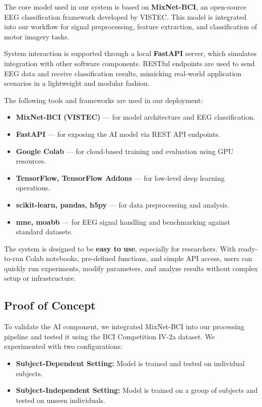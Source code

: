 The core model used in our system is based on \textbf{MixNet-BCI}, an open-source EEG classification framework developed by VISTEC. This model is integrated into our workflow for signal preprocessing, feature extraction, and classification of motor imagery tasks.

System interaction is supported through a local \textbf{FastAPI} server, which simulates integration with other software components.
RESTful endpoints are used to send EEG data and receive classification results, mimicking real-world application scenarios in a lightweight and modular fashion.

The following tools and frameworks are used in our deployment:
\begin{itemize}
    \item \textbf{MixNet-BCI (VISTEC)} — for model architecture and EEG classification.
    \item \textbf{FastAPI} — for exposing the AI model via REST API endpoints.
    \item \textbf{Google Colab} — for cloud-based training and evaluation using GPU resources.
    \item \textbf{TensorFlow, TensorFlow Addons} — for low-level deep learning operations.
    \item \textbf{scikit-learn, pandas, h5py} — for data preprocessing and analysis.
    \item \textbf{mne, moabb} — for EEG signal handling and benchmarking against standard datasets.
\end{itemize}

The system is designed to be \textbf{easy to use}, especially for researchers.
With ready-to-run Colab notebooks, pre-defined functions, and simple API access, users can quickly run experiments, modify parameters, and analyze results without complex setup or infrastructure.

\subsection{Proof of Concept}
\label{subsec:proof-of-concept}
To validate the AI component, we integrated MixNet-BCI into our processing pipeline and tested it using the BCI Competition IV-2a dataset.
We experimented with two configurations:
\begin{itemize}
    \item \textbf{Subject-Dependent Setting:} Model is trained and tested on individual subjects.
    \item \textbf{Subject-Independent Setting:} Model is trained on a group of subjects and tested on unseen individuals.
\end{itemize}

